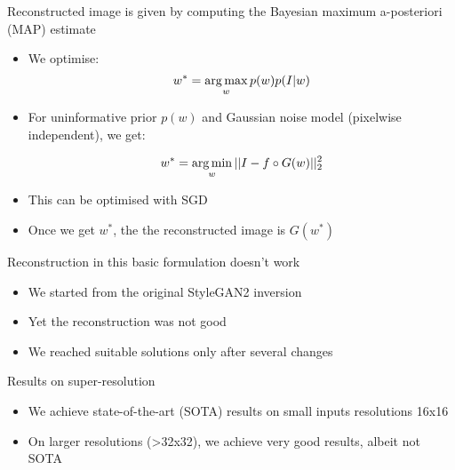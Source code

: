\begin{frame}{Reconstructed image is given by computing the Bayesian maximum a-posteriori (MAP) estimate\\
}

\begin{itemize}
 \item We optimise:
$$ w^* = \operatorname*{arg\,max}_w p(w)p(I|w)$$

\item For uninformative prior $p(w)$ and Gaussian noise model (pixelwise independent), we get:

$$ w^* = \operatorname*{arg\,min}_w || I - f \circ G (w) ||_2^2$$

\item This can be optimised with SGD

\item Once we get $w^*$, the the reconstructed image is $G(w^*)$

\end{itemize}

\begin{center}
\vt
{}
\end{center}
 
\end{frame}

\begin{frame}{Reconstruction in this basic formulation doesn't work}

\begin{itemize}
 \item We started from the original StyleGAN2 inversion
 \item Yet the reconstruction was not good
 \item We reached suitable solutions only after several changes 
\end{itemize}

\begin{center}
\vt
{}
\end{center}
 
\end{frame}

\begin{frame}{Results on super-resolution}

\begin{itemize}
 \item We achieve state-of-the-art (SOTA) results on small inputs resolutions 16x16
 \item On larger resolutions (>32x32), we achieve very good results, albeit not SOTA
\end{itemize}

\begin{center}
\vt
{}
\end{center}
 
\end{frame}

